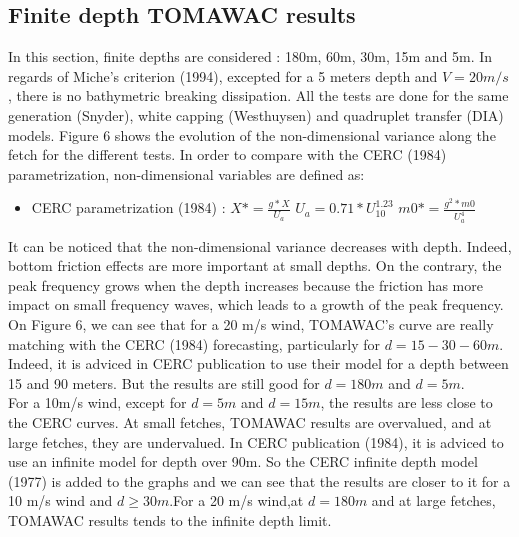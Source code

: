 \documentclass[10pt]{article}
\begin{document}
\subsection{Finite depth TOMAWAC results}
In this section, finite depths are considered : 180m, 60m, 30m, 15m and 5m. In regards of Miche's criterion (1994), excepted for a 5 meters depth and $V = 20m/s$, there is no bathymetric breaking dissipation. All the tests are done for the same generation (Snyder), white capping (Westhuysen) and quadruplet transfer (DIA) models. Figure 6 shows the evolution of the non-dimensional variance along the fetch for the different tests. In order to compare with the CERC (1984) parametrization, non-dimensional variables are defined as:\\
\begin{itemize}
\item CERC parametrization (1984) :
\subitem $X* = \frac{g*X}{U_a}$
\subitem $U_a = 0.71*U_{10}^{1.23}$
\subitem $m0* = \frac{g^2*m0}{U_a^4}$
\end{itemize}
It can be noticed that the non-dimensional variance decreases with depth. Indeed, bottom friction effects are more important at small depths. On the contrary, the peak frequency grows when the depth increases because the friction has more impact on small frequency waves, which leads to a growth of the peak frequency.\\
On Figure 6, we can see that for a 20 m/s wind, TOMAWAC's curve are really matching with the CERC (1984) forecasting, particularly for $d = 15 - 30 - 60 m$. Indeed, it is adviced in CERC publication to use their model for a depth between 15 and 90 meters. But the results are still good for $d = 180 m$ and $d = 5 m$.\\
For a 10m/s wind, except for $d = 5 m $ and $d = 15 m$, the results are less close to the CERC curves. At small fetches, TOMAWAC results are overvalued, and at large fetches, they are undervalued. In CERC publication (1984), it is adviced to use an infinite model for depth over 90m. So the CERC infinite depth model (1977) is added to the graphs and we can see that the results are closer to it for a 10 m/s wind and $d \geq 30m$.For a 20 m/s wind,at $d = 180m$ and at large fetches, TOMAWAC results tends to the infinite depth limit.
\end{document}
